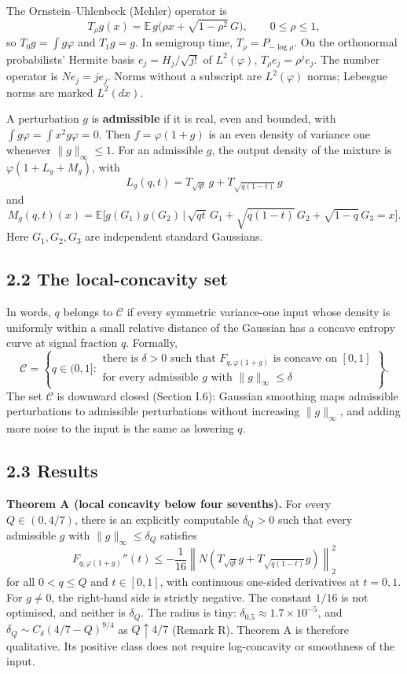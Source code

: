 \documentclass[
  british,
  10pt,
]{article}
\begin{document}
The Ornstein--Uhlenbeck (Mehler) operator is \[
T_\rho g(x)=\mathbb E\,g\bigl(\rho x+\sqrt{1-\rho^2}\,G\bigr),\qquad 0\le\rho\le1,
\] so \(T_0g=\int g\varphi\) and \(T_1g=g\). In semigroup time,
\(T_\rho=P_{-\log\rho}\). On the orthonormal probabilists' Hermite basis
\(e_j=H_j/\sqrt{j!}\) of \(L^2(\varphi)\), \(T_\rho e_j=\rho^je_j\). The
number operator is \(Ne_j=je_j\). Norms without a subscript are
\(L^2(\varphi)\) norms; Lebesgue norms are marked \(L^2(dx)\).

A perturbation \(g\) is \textbf{admissible} if it is real, even and
bounded, with \(\int g\varphi=\int x^2g\varphi=0\). Then
\(f=\varphi(1+g)\) is an even density of variance one whenever
\(\|g\|_\infty\le1\). For an admissible \(g\), the output density of the
mixture is \(\varphi(1+L_g+M_g)\), with \[
L_g(q,t)=T_{\sqrt{qt}}\,g+T_{\sqrt{q(1-t)}}\,g
\tag{L}
\] and \[
M_g(q,t)(x)=\mathbb E\bigl[g(G_1)g(G_2)\,\big|\,\sqrt{qt}\,G_1+\sqrt{q(1-t)}\,G_2+\sqrt{1-q}\,G_3=x\bigr].
\tag{Q}
\] Here \(G_1,G_2,G_3\) are independent standard Gaussians.

\subsection{2.2 The local-concavity set}\label{the-local-concavity-set}

In words, \(q\) belongs to \(\mathcal C\) if every symmetric
variance-one input whose density is uniformly within a small relative
distance of the Gaussian has a concave entropy curve at signal fraction
\(q\). Formally, \[
\mathcal C=
\left\{q\in(0,1]:
\begin{array}{l}
\text{there is }\delta>0\text{ such that }F_{q,\varphi(1+g)}\text{ is concave on }[0,1]\\
\text{for every admissible }g\text{ with }\|g\|_\infty\le\delta
\end{array}\right\}.
\] The set \(\mathcal C\) is downward closed (Section I.6): Gaussian
smoothing maps admissible perturbations to admissible perturbations
without increasing \(\|g\|_\infty\), and adding more noise to the input
is the same as lowering \(q\).

\subsection{2.3 Results}\label{results}

\textbf{Theorem A (local concavity below four sevenths).} For every
\(Q\in(0,4/7)\), there is an explicitly computable \(\delta_Q>0\) such
that every admissible \(g\) with \(\|g\|_\infty\le\delta_Q\) satisfies
\[
F_{q,\varphi(1+g)}''(t)
\le-\frac1{16}
\left\|N\left(T_{\sqrt{qt}}g+T_{\sqrt{q(1-t)}}g\right)\right\|_{2}^2
\tag{A}
\] for all \(0<q\le Q\) and \(t\in[0,1]\), with continuous one-sided
derivatives at \(t=0,1\). For \(g\ne0\), the right-hand side is strictly
negative. The constant \(1/16\) is not optimised, and neither is
\(\delta_Q\). The radius is tiny:
\(\delta_{0.5}\approx1.7\times10^{-5}\), and
\(\delta_Q\sim C_\delta(4/7-Q)^{9/4}\) as \(Q\uparrow4/7\) (Remark R).
Theorem A is therefore qualitative. Its positive class does not require
log-concavity or smoothness of the input.
\end{document}
